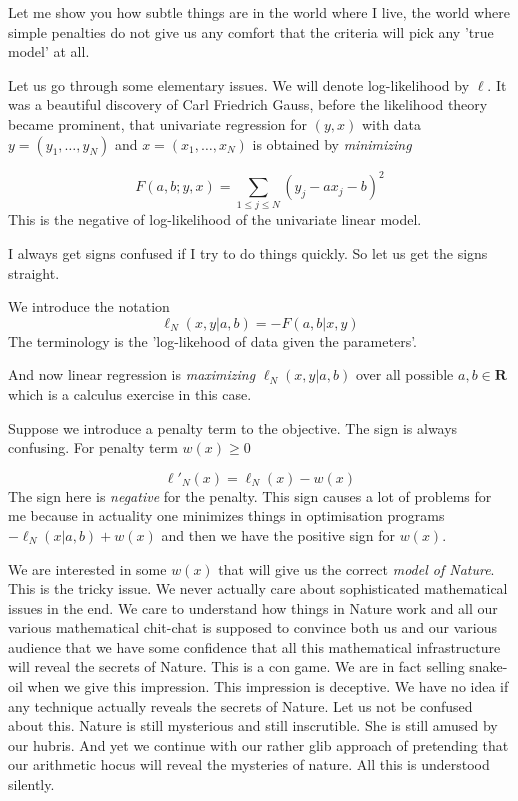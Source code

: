 \documentclass{amsart}
\begin{document}
Let me show you how subtle things are in the world where I live, the world where simple penalties do not give us any comfort that the criteria will pick any 'true model' at all.

Let us go through some elementary issues.  We will denote log-likelihood by $\ell$.  It was a beautiful discovery of Carl Friedrich Gauss, before the likelihood theory became prominent, that univariate regression for $(y,x)$ with data $y=(y_1,\dots, y_N)$ and $x=(x_1, \dots, x_N)$ is obtained by {\em minimizing}

\begin{equation}
F(a,b; y,x) = \sum_{1\le j \le N} (y_j - ax_j - b)^2
\end{equation}
This is the negative of log-likelihood of the univariate linear model.

I always get signs confused if I try to do things quickly.  So let us get the signs straight.

We introduce the notation
\[
\ell_N( x,y |a, b) = - F(a,b | x,y)
\]
The terminology is the 'log-likehood of data given the parameters'.

And now linear regression is {\em maximizing} $\ell_N(x,y|a,b)$ over all possible $a,b\in\mathbf{R}$ which is a calculus exercise in this case.

Suppose we introduce a penalty term to the objective.  The sign is always confusing.  For penalty term $w(x) \ge 0$

\begin{equation}
\ell'_N(x) = \ell_N(x) - w(x)
\end{equation}
The sign here is {\em negative} for the penalty.  This sign causes a lot of problems for me because in actuality one minimizes things in optimisation programs $-\ell_N(x|a,b)+w(x)$
and then we have the positive sign for $w(x)$.

We are interested in some $w(x)$ that will give us the correct {\em model of Nature}.  This is the tricky issue.  We never actually care about sophisticated mathematical issues in the end.  We care to understand how things in Nature work and all our various mathematical chit-chat is supposed to convince both us and our various audience that we have some confidence that all this mathematical infrastructure will reveal the secrets of Nature.  This is a con game.  We are in fact selling snake-oil when we give this impression.  This impression is deceptive.  We have no idea if any technique actually reveals the secrets of Nature.  Let us not be confused about this.  Nature is still mysterious and still inscrutible.  She is still amused by our hubris.  And yet we continue with our rather glib approach of pretending that our arithmetic hocus will reveal the mysteries of nature.  All this is understood silently.
\end{document}
